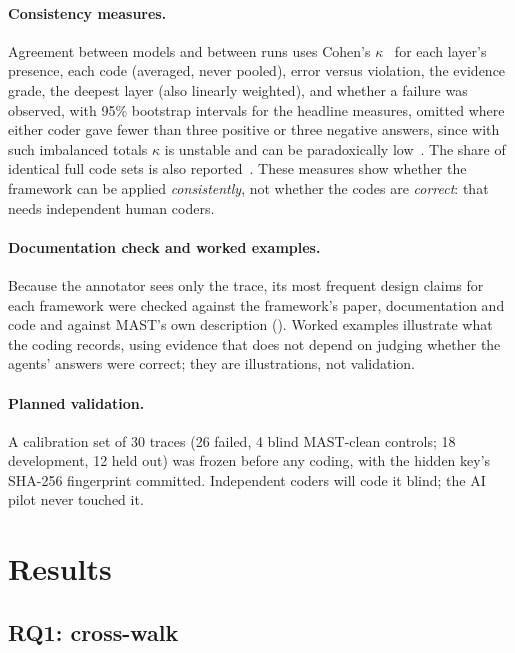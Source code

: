 \documentclass[11pt]{article}
\begin{document}
\paragraph{Consistency measures.} Agreement between models and between runs uses
Cohen's $\kappa$~\cite{cohen1960kappa,landis1977measurement} for each layer's
presence, each code (averaged, never pooled), error versus violation, the evidence
grade, the deepest layer (also linearly weighted), and whether a failure was
observed, with 95\% bootstrap intervals for the headline measures, omitted where
either coder gave fewer than three positive or three negative answers, since with
such imbalanced totals $\kappa$ is unstable and can be paradoxically
low~\cite{feinstein1990paradox}. The share of identical full code sets is
also reported~\cite{ahmadi2025hfacsgrpo}. These measures show whether the
framework can be applied \emph{consistently}, not whether the codes are
\emph{correct}: that needs independent human coders.

\paragraph{Documentation check and worked examples.} Because the annotator sees
only the trace, its most frequent design claims for each framework were checked
against the framework's paper, documentation and code and against MAST's own
description (). Worked examples illustrate what the
coding records, using evidence that does not depend on judging whether the agents'
answers were correct;
they are illustrations, not validation.

\paragraph{Planned validation.} A calibration set of 30 traces (26 failed, 4 blind
MAST-clean controls; 18 development, 12 held out) was frozen before any coding,
with the hidden key's SHA-256 fingerprint committed. Independent coders will code
it blind; the AI pilot never touched it.

\section{Results}
\label{sec:results}

\subsection{RQ1: cross-walk}
\end{document}
